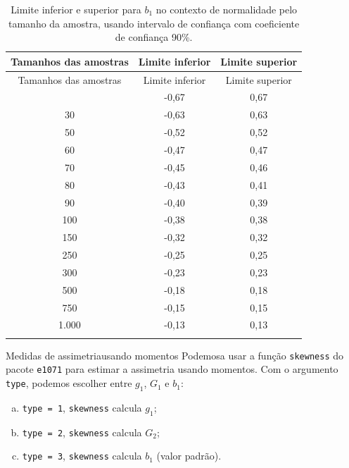 \documentclass[
  10pt,
  ignorenonframetext,
]{beamer}
\providecommand{\tightlist}{%
  \setlength{\itemsep}{0pt}\setlength{\parskip}{0pt}}\usepackage{longtable,booktabs,array}
\begin{document}
\begin{frame}
\begin{longtable}[]{@{}ccc@{}}
\caption{Limite inferior e superior para \(b_1\) no contexto de
normalidade pelo tamanho da amostra, usando intervalo de confiança com
coeficiente de confiança 90\%.}\tabularnewline
\toprule\noalign{}
Tamanhos das amostras & Limite inferior & Limite superior \\
\midrule\noalign{}
\endfirsthead
\toprule\noalign{}
Tamanhos das amostras & Limite inferior & Limite superior \\
\midrule\noalign{}
\endhead
25 & -0,67 & 0,67 \\
30 & -0,63 & 0,63 \\
50 & -0,52 & 0,52 \\
60 & -0,47 & 0,47 \\
70 & -0,45 & 0,46 \\
80 & -0,43 & 0,41 \\
90 & -0,40 & 0,39 \\
100 & -0,38 & 0,38 \\
150 & -0,32 & 0,32 \\
250 & -0,25 & 0,25 \\
300 & -0,23 & 0,23 \\
500 & -0,18 & 0,18 \\
750 & -0,15 & 0,15 \\
1.000 & -0,13 & 0,13 \\
\bottomrule\noalign{}
\end{longtable}
\end{frame}

\begin{frame}[fragile]{Medidas de assimetria\newline usando momentos}
\protect\hypertarget{medidas-de-assimetriausando-momentos-2}{}
Podemosa usar a função \texttt{skewness} do pacote \texttt{e1071} para
estimar a assimetria usando momentos. Com o argumento \texttt{type},
podemos escolher entre \(g_1\), \(G_1\) e \(b_1\):

\begin{enumerate}
[a.]
\tightlist
\item
  \texttt{type\ =\ 1}, \texttt{skewness} calcula \(g_1\);
\item
  \texttt{type\ =\ 2}, \texttt{skewness} calcula \(G_2\);
\item
  \texttt{type\ =\ 3}, \texttt{skewness} calcula \(b_1\) (valor padrão).
\end{enumerate}
\end{frame}
\end{document}
